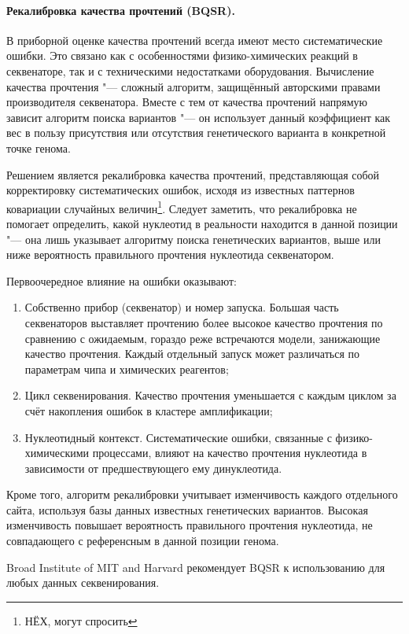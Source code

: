 \documentclass[a4paper,12pt]{article}
\begin{document}
\paragraph{Рекалибровка качества прочтений (BQSR).}
В приборной оценке качества прочтений всегда имеют место систематические ошибки.
Это связано как с особенностями физико-химических реакций в секвенаторе, так и с техническими недостатками оборудования.
Вычисление качества прочтения "--- сложный алгоритм, защищённый авторскими правами производителя секвенатора.
Вместе с тем от качества прочтений напрямую зависит алгоритм поиска вариантов "--- он использует данный коэффициент как вес в пользу присутствия или отсутствия генетического варианта в конкретной точке генома.

Решением является рекалибровка качества прочтений, представляющая собой корректировку систематических ошибок, исходя из известных паттернов ковариации случайных величин\footnote{НЁХ, могут спросить}.
Следует заметить, что рекалибровка не помогает определить, какой нуклеотид в реальности находится в данной позиции "--- она лишь указывает алгоритму поиска генетических вариантов, выше или ниже вероятность правильного прочтения нуклеотида секвенатором.

Первоочередное влияние на ошибки оказывают:

\begin{enumerate}
\item Собственно прибор (секвенатор) и номер запуска.
Большая часть секвенаторов выставляет прочтению более высокое качество прочтения по сравнению с ожидаемым, гораздо реже встречаются модели, занижающие качество прочтения\cite{gatk}.
Каждый отдельный запуск может различаться по параметрам чипа и химических реагентов;
\item Цикл секвенирования.
Качество прочтения уменьшается с каждым циклом за счёт накопления ошибок в кластере амплификации;
\item Нуклеотидный контекст.
Систематические ошибки, связанные с физико-химическими процессами, влияют на качество прочтения нуклеотида в зависимости от предшествующего ему динуклеотида.
\end{enumerate}

Кроме того, алгоритм рекалибровки учитывает изменчивость каждого отдельного сайта, используя базы данных известных генетических вариантов.
Высокая изменчивость повышает вероятность правильного прочтения нуклеотида, не совпадающего с референсным в данной позиции генома.

Broad Institute of MIT and Harvard рекомендует BQSR к использованию для любых данных секвенирования\cite{gatk}.
\end{document}

